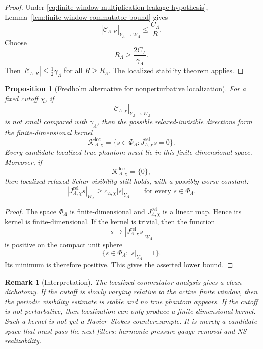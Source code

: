 \documentclass[11pt]{article}
\numberwithin{equation}{section}
\newtheorem{proposition}[theorem]{Proposition}
\newtheorem{remark}[theorem]{Remark}
\begin{document}
\begin{proof}
Under \eqref{eq:finite-window-multiplication-leakage-hypothesis}, Lemma~\ref{lem:finite-window-commutator-bound} gives
\[
        |\mathcal C_{\Lambda,R}|_{Y_\Lambda\to W_\Lambda}
        \le
        \frac{C_\Lambda}{R}.
\]
Choose
\[
        R_\Lambda\ge \frac{2C_\Lambda}{\gamma_\Lambda}.
\]
Then \(|\mathcal C_{\Lambda,R}|\le\frac12\gamma_\Lambda\) for all \(R\ge R_\Lambda\).  The localized stability theorem applies.
\end{proof}

\begin{proposition}[Fredholm alternative for nonperturbative localization]\label{prop:fredholm-nonperturbative-localization}
For a fixed cutoff \(\chi\), if
\[
        |\mathcal C_{\Lambda,\chi}|_{Y_\Lambda\to W_\Lambda}
\]
is not small compared with \(\gamma_\Lambda\), then the possible relaxed-invisible directions form the finite-dimensional kernel
\[
        \mathcal K_{\Lambda,\chi}^{\mathrm{loc}}
        =\{s\in\Phi_\Lambda:
        J_{\Lambda,\chi}^{\mathrm{rel}}s=0\}.
\]
Every candidate localized true phantom must lie in this finite-dimensional space.  Moreover, if
\[
        \mathcal K_{\Lambda,\chi}^{\mathrm{loc}}=\{0\},
\]
then localized relaxed Schur visibility still holds, with a possibly worse constant:
\[
        |J_{\Lambda,\chi}^{\mathrm{rel}}s|_{W_\Lambda}
        \ge
        c_{\Lambda,\chi}|s|_{Y_\Lambda}
        \qquad
        \text{for every }s\in\Phi_\Lambda.
\]
\end{proposition}

\begin{proof}
The space \(\Phi_\Lambda\) is finite-dimensional and \(J_{\Lambda,\chi}^{\mathrm{rel}}\) is a linear map.  Hence its kernel is finite-dimensional.  If the kernel is trivial, then the function
\[
        s\mapsto |J_{\Lambda,\chi}^{\mathrm{rel}}s|_{W_\Lambda}
\]
is positive on the compact unit sphere
\[
        \{s\in\Phi_\Lambda:|s|_{Y_\Lambda}=1\}.
\]
Its minimum is therefore positive.  This gives the asserted lower bound.
\end{proof}

\begin{remark}[Interpretation]\label{rem:localized-commutator-interpretation}
The localized commutator analysis gives a clean dichotomy.  If the cutoff is slowly varying relative to the active finite window, then the periodic visibility estimate is stable and no true phantom appears.  If the cutoff is not perturbative, then localization can only produce a finite-dimensional kernel.  Such a kernel is not yet a Navier--Stokes counterexample.  It is merely a candidate space that must pass the next filters: harmonic-pressure gauge removal and NS-realizability.
\end{remark}
\end{document}
